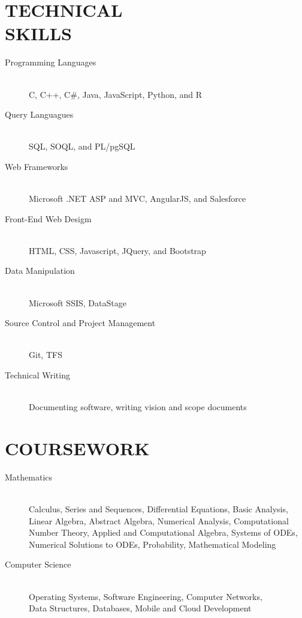 \documentclass[margin]{res}
\begin{document}
\begin{resume}
\section{TECHNICAL \\ SKILLS} 
                \begin{description}
                  \item[Programming Languages] \hfill \\
                  C, C++, C\#, Java, JavaScript, Python, and R 
                  \item[Query Languagues] \hfill \\
                  SQL, SOQL, and PL/pgSQL 
                  \item[Web Frameworks] \hfill \\
                  Microsoft .NET ASP and MVC, AngularJS, and Salesforce 
                  \item[Front-End Web Desigm] \hfill \\
                  HTML, CSS, Javascript, JQuery, and Bootstrap
                  \item[Data Manipulation] \hfill \\
                  Microsoft SSIS, DataStage
                  \item[Source Control and Project Management] \hfill \\
                  Git, TFS
                  \item[Technical Writing] \hfill \\
                  Documenting software, writing vision and scope documents 
                \end{description}            
                
\section{COURSEWORK}
    \begin{description}
                  \item[Mathematics] \hfill \\
                  Calculus, Series and Sequences, Differential Equations, Basic Analysis, \\ Linear Algebra, Abstract Algebra, Numerical Analysis, Computational Number Theory, Applied and Computational Algebra, Systems of ODEs, Numerical Solutions to ODEs, Probability, Mathematical Modeling
                  \item[Computer Science] \hfill \\
                  Operating Systems, Software Engineering, Computer Networks, \\ Data Structures, Databases, Mobile and Cloud Development
                  
                \end{description}

\end{resume}
\end{document}
